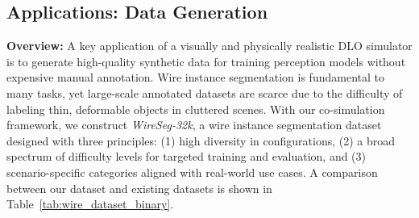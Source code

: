 \documentclass[letterpaper, 10 pt, conference]{ieeeconf}  %
\begin{document}
\begin{table}[t]
\vspace{5pt}
\centering
{}
\caption{SAM3 performance with and without LoRA fine-tuning. For each subset, we report dataset-level F1@75 and COCO mAP@75 (higher is better) on the Easy/Medium/Hard tiers, the full synthetic set, and a held-out real test set. The last row reports the percent improvement from LoRA fine-tuning.}
\vspace{-5pt}
\label{tab:sam_result}
\end{table}


\subsection{Applications: Data Generation}
\noindent\textbf{Overview:} A key application of a visually and physically realistic DLO simulator is to generate high-quality synthetic data for training perception models without expensive manual annotation. Wire instance segmentation is fundamental to many tasks, yet large-scale annotated datasets are scarce due to the difficulty of labeling thin, deformable objects in cluttered scenes. With our co-simulation framework, we construct \textit{WireSeg-32k}, a wire instance segmentation dataset designed with three principles: (1) high diversity in configurations, (2) a broad spectrum of difficulty levels for targeted training and evaluation, and (3) scenario-specific categories aligned with real-world use cases. A comparison between our dataset and existing datasets is shown in Table~\ref{tab:wire_dataset_binary}.
\end{document}
